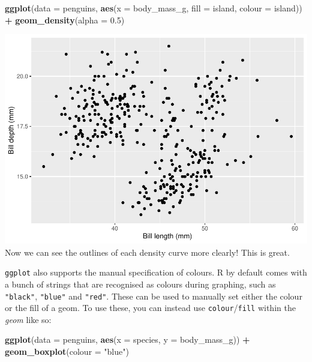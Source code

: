 \documentclass[
]{book}
\newenvironment{Shaded}{\begin{snugshade}}{\end{snugshade}}
\newcommand{\AttributeTok}[1]{\textcolor[rgb]{0.13,0.29,0.53}{#1}}
\newcommand{\FloatTok}[1]{\textcolor[rgb]{0.00,0.00,0.81}{#1}}
\newcommand{\FunctionTok}[1]{\textcolor[rgb]{0.13,0.29,0.53}{\textbf{#1}}}
\newcommand{\NormalTok}[1]{#1}
\newcommand{\SpecialCharTok}[1]{\textcolor[rgb]{0.81,0.36,0.00}{\textbf{#1}}}
\newcommand{\StringTok}[1]{\textcolor[rgb]{0.31,0.60,0.02}{#1}}
\begin{document}
\begin{Shaded}
\begin{Highlighting}[]
\FunctionTok{ggplot}\NormalTok{(}\AttributeTok{data =}\NormalTok{ penguins, }\FunctionTok{aes}\NormalTok{(}\AttributeTok{x =}\NormalTok{ body\_mass\_g, }\AttributeTok{fill =}\NormalTok{ island, }\AttributeTok{colour =}\NormalTok{ island)) }\SpecialCharTok{+} 
  \FunctionTok{geom\_density}\NormalTok{(}\AttributeTok{alpha =} \FloatTok{0.5}\NormalTok{)}
\end{Highlighting}
\end{Shaded}

\includegraphics{_main_files/figure-latex/unnamed-chunk-61-1.pdf}
Now we can see the outlines of each density curve more clearly! This is great.

\texttt{ggplot} also supports the manual specification of colours. R by default comes with a bunch of strings that are recognised as colours during graphing, such as \texttt{"black"}, \texttt{"blue"} and \texttt{"red"}. These can be used to manually set either the colour or the fill of a geom. To use these, you can instead use \texttt{colour}/\texttt{fill} within the \emph{geom} like so:

\begin{Shaded}
\begin{Highlighting}[]
\FunctionTok{ggplot}\NormalTok{(}\AttributeTok{data =}\NormalTok{ penguins, }\FunctionTok{aes}\NormalTok{(}\AttributeTok{x =}\NormalTok{ species, }\AttributeTok{y =}\NormalTok{ body\_mass\_g)) }\SpecialCharTok{+} 
  \FunctionTok{geom\_boxplot}\NormalTok{(}\AttributeTok{colour =} \StringTok{"blue"}\NormalTok{)}
\end{Highlighting}
\end{Shaded}
\end{document}
